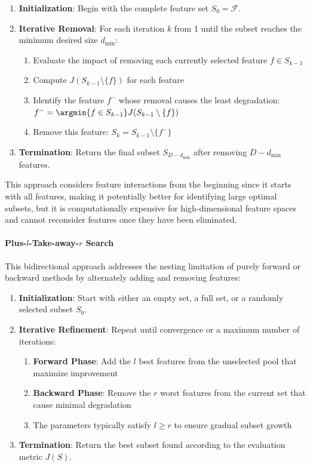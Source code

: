 \begin{enumerate}
    \item \textbf{Initialization}: Begin with the complete feature set $S_0 = \mathcal{F}$.
    \item \textbf{Iterative Removal}: For each iteration $k$ from 1 until the subset reaches the minimum desired size $d_{\text{min}}$:
    \begin{enumerate}
        \item Evaluate the impact of removing each currently selected feature $f \in S_{k-1}$
        \item Compute $J(S_{k-1} \setminus \{f\})$ for each feature
        \item Identify the feature $f^-$ whose removal causes the least degradation: $f^- = \argmin{f \in S_{k-1}} J(S_{k-1} \setminus \{f\})$
        \item Remove this feature: $S_k = S_{k-1} \setminus \{f^-\}$
    \end{enumerate}
    \item \textbf{Termination}: Return the final subset $S_{D-d_{\text{min}}}$ after removing $D-d_{\text{min}}$ features.
\end{enumerate}

This approach considers feature interactions from the beginning since it starts with all features, making it potentially better for identifying large optimal subsets, but it is computationally expensive for high-dimensional feature spaces and cannot reconsider features once they have been eliminated.

\paragraph{Plus-$l$-Take-away-$r$ Search}
This bidirectional approach addresses the nesting limitation of purely forward or backward methods by alternately adding and removing features:

\begin{enumerate}
    \item \textbf{Initialization}: Start with either an empty set, a full set, or a randomly selected subset $S_0$.
    \item \textbf{Iterative Refinement}: Repeat until convergence or a maximum number of iterations:
    \begin{enumerate}
        \item \textbf{Forward Phase}: Add the $l$ best features from the unselected pool that maximize improvement
        \item \textbf{Backward Phase}: Remove the $r$ worst features from the current set that cause minimal degradation
        \item The parameters typically satisfy $l \geq r$ to ensure gradual subset growth
    \end{enumerate}
    \item \textbf{Termination}: Return the best subset found according to the evaluation metric $J(S)$.
\end{enumerate}

